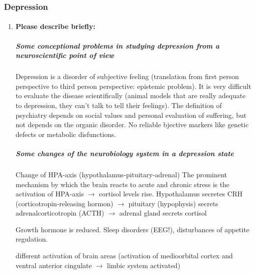 \documentclass[12pt,article,oneside,a4paper]{memoir}
\begin{document}
\subsubsection{Depression}
\begin{enumerate}
\item \paragraph{Please describe briefly:} \subparagraph{Some conceptional problems in studying depression from a neuroscientific point of view} 

Depression is a disorder of subjective feeling (translation from first person perspective to third person perspective: epistemic problem). It is very difficult to evaluate the disease scientifically (animal models that are really adequate to depression, they can’t talk to tell their feelings). The definition of psychiatry depends on social values and personal evaluation of suffering, but not depends on the organic disorder. No reliable bjective markers like genetic defects or metabolic disfunctions.

\subparagraph{Some changes of the neurobiology system in a depression state}
Change of HPA-axis (hypothalamus-pituitary-adrenal)
	The prominent mechanism by which the brain reacts to acute and chronic stress is the activation of HPA-axis $\rightarrow$ cortisol levels rise.
		Hypothalamus secretes CRH (corticotropin-releasing hormon) $\rightarrow$ pituitary (hypophysis) secrets adrenalcorticotropin (ACTH) $\rightarrow$ adrenal gland secrets cortisol

Growth hormone is reduced.
	Sleep disorders (EEG!), disturbances of appetite regulation.

different activation of brain areas (activation of medioorbital cortex and ventral anterior cingulate $\rightarrow$ limbic system activated)

\end{enumerate}
\end{document}
